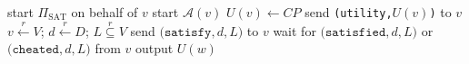 \begin{algorithm}
  \caption{$\mathrm{singleCorruptionGame}_{\mathcal{A}}\left(G = \left(V, E, W\right), CP,
  D, w, end\right)$}
  \label{alg:singlecorruptiongame}
  \begin{algorithmic}[1]
        \State start $\Pi_{\mathrm{SAT}}$ on behalf of $v$
      \Else
        \State start $\mathcal{A}\left(v\right)$
      \EndIf
      \State $U\left(v\right) \leftarrow CP$
      \State send \texttt{(utility,}$U\left(v\right)$\texttt{)} to $v$
    \EndFor
      \State $v \overset{r}{\leftarrow} V$; $d \overset{r}{\leftarrow} D$; $L
      \overset{r}{\subseteq} V$
      \State send $\mathtt{(satisfy,} d \mathtt{,} L \mathtt{)}$ to $v$
      \State wait for $\mathtt{(satisfied,} d \mathtt{,} L \mathtt{)}$ or
      $\mathtt{(cheated,} d \mathtt{,} L \mathtt{)}$ from $v$
    \EndFor
    \State output $U\left(w\right)$
  \end{algorithmic}
\end{algorithm}
